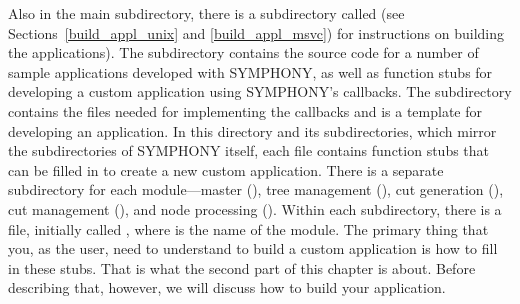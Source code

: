 Also in the main  subdirectory, there is a subdirectory called
 (see Sections~\ref{build_appl_unix} and
\ref{build_appl_msvc}) for instructions on building the applications). The
 subdirectory contains the source code for a number of
sample applications developed with SYMPHONY, as well as function stubs for
developing a custom application using SYMPHONY's callbacks. The subdirectory
 contains the files needed for implementing
the callbacks and is a template for developing an application. In this
directory and its subdirectories, which mirror the subdirectories of SYMPHONY
itself, each file contains function stubs that can be filled in to create a
new custom application. There is a separate subdirectory for each
module---master (), tree management (), cut
generation (), cut management (), and node
processing (). Within each subdirectory, there is a file, initially
called , where \code{*} is the name of the module. The
primary thing that you, as the user, need to understand to build a custom
application is how to fill in these stubs. That is what the second part of
this chapter is about. Before describing that, however, we will discuss how to
build your application. 



